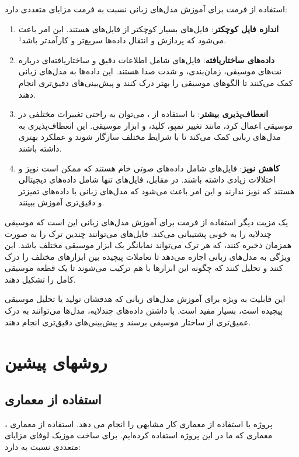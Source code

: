 استفاده از فرمت  برای آموزش مدل‌های زبانی نسبت به فرمت  مزایای
متعددی دارد:

\begin{enumerate}
\def\labelenumi{\arabic{enumi}.}
\item
  \textbf{اندازه فایل کوچکتر}: فایل‌های  بسیار کوچکتر از فایل‌های 
  هستند. این امر باعث می‌شود که پردازش و انتقال داده‌ها سریع‌تر و کارآمدتر
  باشد¹.
\item
  \textbf{داده‌های ساختاریافته}: فایل‌های  شامل اطلاعات دقیق و
  ساختاریافته‌ای درباره نت‌های موسیقی، زمان‌بندی، و شدت صدا هستند. این
  داده‌ها به مدل‌های زبانی کمک می‌کنند تا الگوهای موسیقی را بهتر درک کنند و
  پیش‌بینی‌های دقیق‌تری انجام دهند.
\item
  \textbf{انعطاف‌پذیری بیشتر}: با استفاده از ، می‌توان به راحتی
  تغییرات مختلفی در موسیقی اعمال کرد، مانند تغییر تمپو، کلید، و ابزار
  موسیقی. این انعطاف‌پذیری به مدل‌های زبانی کمک می‌کند تا با شرایط مختلف
 سازگار شوند و عملکرد بهتری داشته باشند.
\item
  \textbf{کاهش نویز}: فایل‌های  شامل داده‌های صوتی خام هستند که ممکن
  است نویز و اختلالات زیادی داشته باشند. در مقابل، فایل‌های  تنها
  شامل داده‌های دیجیتالی هستند که نویز ندارند و این امر باعث می‌شود که
  مدل‌های زبانی با داده‌های تمیزتر و دقیق‌تری آموزش ببینند.
\end{enumerate}

یک مزیت دیگر استفاده از فرمت  برای آموزش مدل‌های زبانی این است که موسیقی چندلایه را به خوبی پشتیبانی می‌کند. فایل‌های  می‌توانند چندین ترک  را به صورت همزمان ذخیره کنند، که هر ترک می‌تواند نمایانگر یک ابزار موسیقی مختلف باشد. این ویژگی به مدل‌های زبانی اجازه می‌دهد تا تعاملات پیچیده بین ابزارهای مختلف را درک کنند و تحلیل کنند که چگونه این ابزارها با هم ترکیب می‌شوند تا یک قطعه موسیقی کامل را تشکیل دهند.

این قابلیت به ویژه برای آموزش مدل‌های زبانی که هدفشان تولید یا تحلیل موسیقی پیچیده است، بسیار مفید است. با داشتن داده‌های چندلایه، مدل‌ها می‌توانند به درک عمیق‌تری از ساختار موسیقی برسند و پیش‌بینی‌های دقیق‌تری انجام دهند.

\section{روشهای پيشين}
\subsection{استفاده از معماری }
پروژه  \cite{Zhang} با استفاده از معماری  کار مشابهی را انجام می دهد.
استفاده از معماری ، معماری که ما در این پروژه استفاده کرده‌ایم. برای ساخت موزیک
لوفای  مزایای متعددی نسبت به   دارد:

